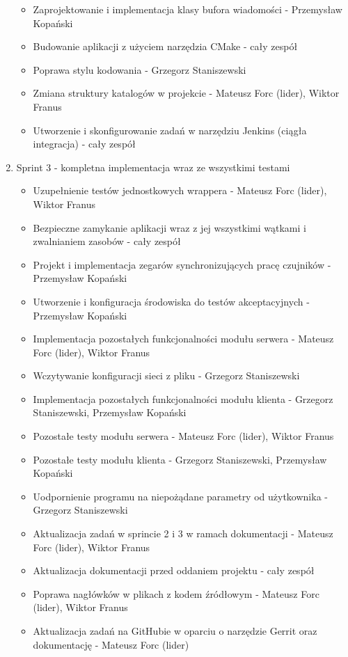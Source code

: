 \documentclass[a4paper,11pt]{article}
\begin{document}
\begin{enumerate}
\begin{itemize}
\item Zaprojektowanie i implementacja klasy bufora wiadomości - Przemysław Kopański
\item Budowanie aplikacji z użyciem narzędzia CMake - cały zespół
\item Poprawa stylu kodowania - Grzegorz Staniszewski
\item Zmiana struktury katalogów w projekcie - Mateusz Forc (lider), Wiktor Franus
\item Utworzenie i skonfigurowanie zadań w narzędziu Jenkins (ciągła integracja) - cały zespół
\end{itemize}
\item Sprint 3 - kompletna implementacja wraz ze wszystkimi testami
\begin{itemize}
\item Uzupełnienie testów jednostkowych wrappera - Mateusz Forc (lider), Wiktor Franus
\item Bezpieczne zamykanie aplikacji wraz z jej wszystkimi wątkami i zwalnianiem zasobów - cały zespół
\item Projekt i implementacja zegarów synchronizujących pracę czujników - Przemysław Kopański
\item Utworzenie i konfiguracja środowiska do testów akceptacyjnych - Przemysław Kopański
\item Implementacja pozostałych funkcjonalności modułu serwera - Mateusz Forc (lider), Wiktor Franus
\item Wczytywanie konfiguracji sieci z pliku - Grzegorz Staniszewski
\item Implementacja pozostałych funkcjonalności modułu klienta
      - Grzegorz Staniszewski, Przemysław Kopański
\item Pozostałe testy modułu serwera - Mateusz Forc (lider), Wiktor Franus
\item Pozostałe testy modułu klienta - Grzegorz Staniszewski, Przemysław Kopański
\item Uodpornienie programu na niepożądane parametry od użytkownika
      - Grzegorz Staniszewski
\item Aktualizacja zadań w sprincie 2 i 3 w ramach dokumentacji - Mateusz Forc (lider), Wiktor Franus
\item Aktualizacja dokumentacji przed oddaniem projektu - cały zespół
\item Poprawa nagłówków w plikach z kodem źródłowym  - Mateusz Forc (lider), Wiktor Franus
\item Aktualizacja zadań na GitHubie w oparciu o narzędzie Gerrit oraz dokumentację - Mateusz Forc (lider)

\end{itemize}
\end{enumerate}
\end{document}
